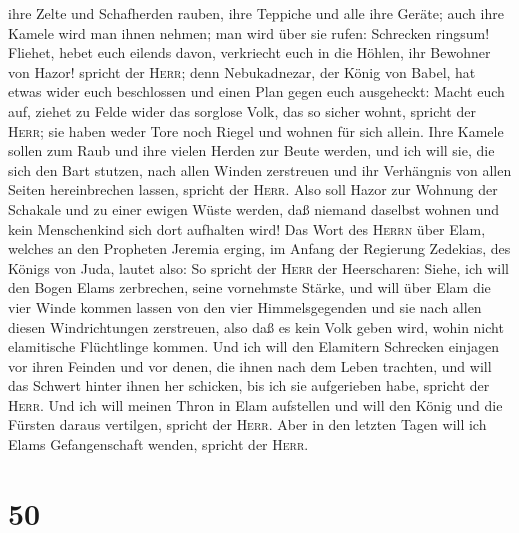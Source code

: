 ihre Zelte und Schafherden rauben, ihre Teppiche und alle ihre Geräte;
auch ihre Kamele wird man ihnen nehmen; man wird über sie rufen:
 Schrecken ringsum! Fliehet, hebet euch eilends davon,
verkriecht euch in die Höhlen, ihr Bewohner von Hazor! spricht der
\textsc{Herr}; denn Nebukadnezar, der König von Babel, hat etwas wider
euch beschlossen und einen Plan gegen euch ausgeheckt: 
Macht euch auf, ziehet zu Felde wider das sorglose Volk, das so sicher
wohnt, spricht der \textsc{Herr}; sie haben weder Tore noch Riegel und
wohnen für sich allein.  Ihre Kamele sollen zum Raub und
ihre vielen Herden zur Beute werden, und ich will sie, die sich den Bart
stutzen, nach allen Winden zerstreuen und ihr Verhängnis von allen
Seiten hereinbrechen lassen, spricht der \textsc{Herr}. 
Also soll Hazor zur Wohnung der Schakale und zu einer ewigen Wüste
werden, daß niemand daselbst wohnen und kein Menschenkind sich dort
aufhalten wird!  Das Wort des \textsc{Herrn} über Elam,
welches an den Propheten Jeremia erging, im Anfang der Regierung
Zedekias, des Königs von Juda, lautet also:  So spricht
der \textsc{Herr} der Heerscharen: Siehe, ich will den Bogen Elams
zerbrechen, seine vornehmste Stärke,  und will über Elam
die vier Winde kommen lassen von den vier Himmelsgegenden und sie nach
allen diesen Windrichtungen zerstreuen, also daß es kein Volk geben
wird, wohin nicht elamitische Flüchtlinge kommen.  Und
ich will den Elamitern Schrecken einjagen vor ihren Feinden und vor
denen, die ihnen nach dem Leben trachten, und will das Schwert hinter
ihnen her schicken, bis ich sie aufgerieben habe, spricht der
\textsc{Herr}.  Und ich will meinen Thron in Elam
aufstellen und will den König und die Fürsten daraus vertilgen, spricht
der \textsc{Herr}.  Aber in den letzten Tagen will ich
Elams Gefangenschaft wenden, spricht der \textsc{Herr}.

\hypertarget{section-49}{%
\section{50}\label{section-49}}

